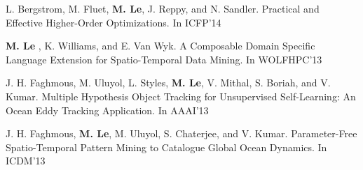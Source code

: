 \documentclass[12pt]{article}
\begin{document}
\begingroup
\renewcommand{\section}[2]{}%
{\footnotesize
\begin{thebibliography}{}


 L. Bergstrom, M. Fluet, {\bf M. Le}, J. Reppy, and N. Sandler. Practical and Effective Higher-Order Optimizations. In ICFP'14

 {\bf M. Le} , K. Williams, and E. Van Wyk. A Composable Domain Specific Language Extension for Spatio-Temporal Data Mining. In WOLFHPC'13

 J. H. Faghmous, M. Uluyol, L. Styles, {\bf M. Le}, V. Mithal, S. Boriah, and V. Kumar. Multiple Hypothesis Object Tracking for Unsupervised Self-Learning: An Ocean Eddy Tracking Application. In AAAI'13

 J. H. Faghmous, {\bf M. Le}, M. Uluyol, S. Chaterjee, and V. Kumar. Parameter-Free Spatio-Temporal Pattern Mining to Catalogue Global Ocean Dynamics. In ICDM'13


\end{thebibliography}
}
\endgroup
\end{document}
